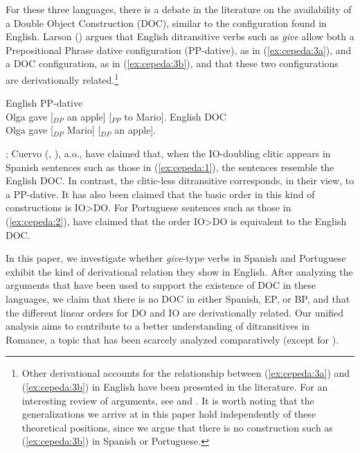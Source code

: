\documentclass[output=paper,colorlinks,citecolor=brown,nonflat]{./langscibook}
\begin{document}
For these three languages, there is a debate in the literature on the availability of a Double Object Construction (DOC), similar to the configuration found in English. Larson (\citeyear{Larson1988, Larson2014}) argues that English ditransitive verbs such as \textit{give} allow both a Prepositional Phrase dative configuration (PP-dative), as in (\ref{ex:cepeda:3a}), and a DOC configuration, as in (\ref{ex:cepeda:3b}), and that these two configurations are derivationally related.\footnote{Other derivational accounts for the relationship between (\ref{ex:cepeda:3a}) and (\ref{ex:cepeda:3b}) in English have been presented in the literature. For an interesting review of arguments, see \citet{RappaportHovavLevin2008} and \citet{Hallman2015}. It is worth noting that the generalizations we arrive at in this paper hold independently of these theoretical positions, since we argue that there is no construction such as (\ref{ex:cepeda:3b}) in Spanish or Portuguese.} 

\ea%
    \label{ex:cepeda:3}
	\ea\label{ex:cepeda:3a}
	English PP-dative\\
		Olga gave [$_{DP}$ an apple] [$_{PP}$ to Mario].
	\ex\label{ex:cepeda:3b}
	English DOC\\
		Olga gave [$_{DP}$ Mario] [$_{DP}$ an apple].
	\z
\z

\citet{Demonte1995, Bleam2003}; Cuervo (\citeyear{Cuervo2003}, \citeyear{Cuervo2010Proceedings}), a.o., have claimed that, when the IO-doubling clitic appears in Spanish sentences such as those in (\ref{ex:cepeda:1}), the sentences resemble the English DOC. In contrast, the clitic-less ditransitive corresponds, in their view, to a PP-dative. It has also been claimed that the basic order in this kind of constructions is IO>DO. For Portuguese sentences such as those in (\ref{ex:cepeda:2}), \citet{TorresMoraisSalles2010} have claimed that the order IO>DO is equivalent to the English DOC.

In this paper, we investigate whether \textit{give}-type verbs in Spanish and Portuguese exhibit the kind of derivational relation they show in English. After analyzing the arguments that have been used to support the existence of DOC in these languages, we claim that there is no DOC in either Spanish, EP, or BP, and that the different linear orders for DO and IO are derivationally related. Our unified analysis aims to contribute to a better understanding of ditransitives in Romance, a topic that has been scarcely analyzed comparatively (except for \citealt{Pineda2016}).
\end{document}
